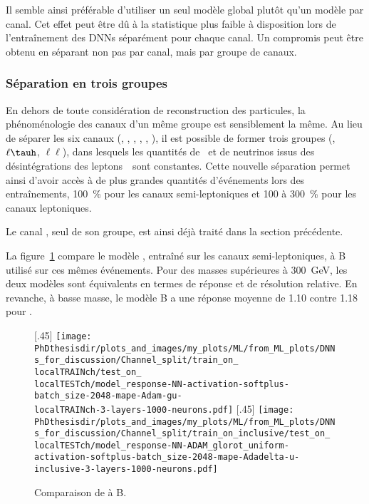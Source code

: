 \par
Il semble ainsi préférable d'utiliser un seul modèle global plutôt qu'un modèle par canal.
Cet effet peut être dû à la statistique plus faible à disposition lors de l'entraînement des DNNs séparément pour chaque canal.
Un compromis peut être obtenu en séparant non pas par canal, mais par groupe de canaux.
\subsubsection{Séparation en trois groupes}
En dehors de toute considération de reconstruction des particules,
la phénoménologie des canaux d'un même groupe
est sensiblement la même.
Au lieu de séparer les six canaux (\tauh\tauh, \mu\tauh, \ele\tauh, \mu\mu, \ele\mu, \ele\ele),
il est possible de former trois groupes (\tauh\tauh, $\ell\tauh$, $\ell\ell$),
dans lesquels les quantités de \tauh\ et de neutrinos issus des désintégrations des leptons~\tau\ sont constantes.
Cette nouvelle séparation permet ainsi d'avoir accès à de plus grandes quantités d'événements lors des entraînements,
\SI{+100}{\%} pour les canaux semi-leptoniques et \num{+100} à \SI{+300}{\%} pour les canaux leptoniques.
\par
Le canal \tauh\tauh, seul de son groupe, est ainsi déjà traité dans la section précédente.
\par
La figure~\ref{fig-lt} compare le modèle
, entraîné sur les canaux semi-leptoniques,
à B utilisé sur ces mêmes événements.
Pour des masses supérieures à \SI{300}{\GeV},
les deux modèles sont équivalents en termes de réponse et de résolution relative.
En revanche, à basse masse, le modèle B a une réponse moyenne de \num{1.10} contre \num{1.18} pour .
\begin{figure}[h]
\centering

\def\localTRAINch{lt}
\def\localTESTch{lt}
\subcaptionbox{Modèle \Bchsplit{\localTRAINch} testé sur \GetChannelStr{\localTESTch}.\label{subfig-reponse_model_train_on_\localTRAINch_test_on_\localTESTch}}[.45\textwidth]
{\texttt{[image: \\PhDthesisdir/plots\_and\_images/my\_plots/ML/from\_ML\_plots/DNNs\_for\_discussion/Channel\_split/train\_on\_\\localTRAINch/test\_on\_\\localTESTch/model\_response-NN-activation-softplus-batch\_size-2048-mape-Adam-gu-\\localTRAINch-3-layers-1000-neurons.pdf]}\vspace{-.5\baselineskip}}
\hfill
\subcaptionbox{Modèle B testé sur \GetChannelStr{\localTESTch}.\label{subfig-reponse_model_train_on_inclusive_test_on_\localTESTch}}[.45\textwidth]
{\texttt{[image: \\PhDthesisdir/plots\_and\_images/my\_plots/ML/from\_ML\_plots/DNNs\_for\_discussion/Channel\_split/train\_on\_inclusive/test\_on\_\\localTESTch/model\_response-NN-ADAM\_glorot\_uniform-activation-softplus-batch\_size-2048-mape-Adadelta-u-inclusive-3-layers-1000-neurons.pdf]}\vspace{-.5\baselineskip}}

\caption[Comparaison du modèle entraîné sur les canaux semi-leptoniques au modèle B.]{Comparaison de  à B.}
\label{fig-lt}
\end{figure}

